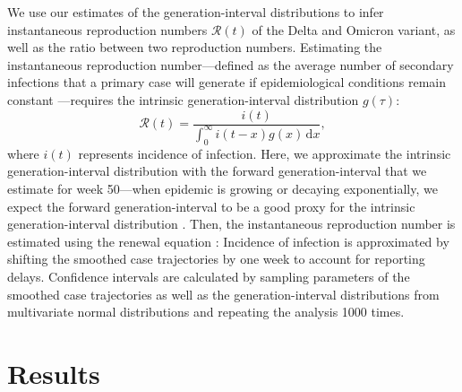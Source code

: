 \documentclass[12pt]{article}
\newcommand{\dd}[1]{\ensuremath{\, \mathrm{d}#1}}
\newcommand{\dx}{\dd{x}}
\begin{document}
We use our estimates of the generation-interval distributions to infer instantaneous reproduction numbers $\mathcal R(t)$ of the Delta and Omicron variant, as well as the ratio between two reproduction numbers.
Estimating the instantaneous reproduction number---defined as the average number of secondary infections that a primary case will generate if epidemiological conditions remain constant \citep{fraser2007estimating}---requires the intrinsic generation-interval distribution $g(\tau)$:
\begin{equation}
\mathcal R(t) = \frac{i(t)}{\int_0^\infty i(t-x) g(x) \dx},
\end{equation}
where $i(t)$ represents incidence of infection.
Here, we approximate the intrinsic generation-interval distribution with the forward generation-interval that we estimate for week 50---when epidemic is growing or decaying exponentially, we expect the forward generation-interval to be a good proxy for the intrinsic generation-interval distribution \citep{champredon2015intrinsic, park2020inferring}.
Then, the instantaneous reproduction number is estimated using the renewal equation \citep{fraser2007estimating}:
Incidence of infection is approximated by shifting the smoothed case trajectories by one week to account for reporting delays.
Confidence intervals are calculated by sampling parameters of the smoothed case trajectories as well as the generation-interval distributions from multivariate normal distributions and repeating the analysis 1000 times.

\section{Results}
\end{document}
